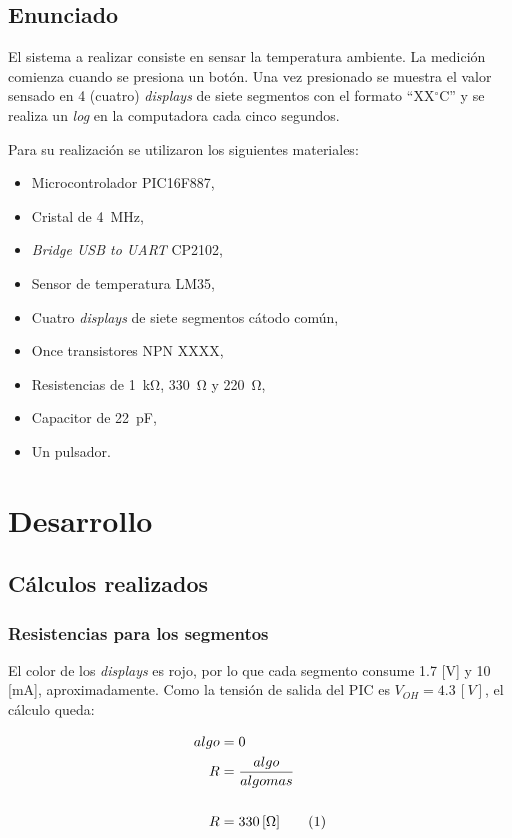 \documentclass[12pt,a4paper]{article}
\newcommand\numberthis{\addtocounter{equation}{1}\tag{\theequation}}
\begin{document}
\subsection{Enunciado}
	El sistema a realizar consiste en sensar la temperatura ambiente. La medición comienza cuando se presiona un botón. Una vez presionado se muestra el valor sensado en 4 (cuatro) \emph{displays} de siete segmentos con el formato ``XX$^{\circ}$C'' y se realiza un \emph{log} en la computadora cada cinco segundos.
	
	Para su realización se utilizaron los siguientes materiales:
	
	\begin{itemize}[leftmargin=1.5cm,nosep]
	\item Microcontrolador PIC16F887,
	\item Cristal de \SI{4}{\MHz},
	\item \emph{Bridge USB to UART} CP2102,
	\item Sensor de temperatura LM35,
	\item Cuatro \emph{displays} de siete segmentos cátodo común,
	\item Once transistores NPN XXXX,
	\item Resistencias de \SI{1}{\kilo\ohm}, \SI{330}{\ohm} y \SI{220}{\ohm},
	\item Capacitor de \SI{22}{\pico\F},
	\item Un pulsador.
	\end{itemize}

\section{Desarrollo}
		
\subsection{Cálculos realizados}

\subsubsection{Resistencias para los segmentos}
	El color de los \emph{displays} es rojo, por lo que cada segmento consume 1.7 [V] y 10 [mA], aproximadamente. Como la tensión de salida del PIC es $V_{OH} = 4.3\,[V]$, el cálculo queda:
	
	\begin{align*}
	algo &= 0\\
	R &= \frac{algo}{algomas}\\
	\\R &= 330 \, [\Omega] \numberthis
	\end{align*}
	
\end{document}
